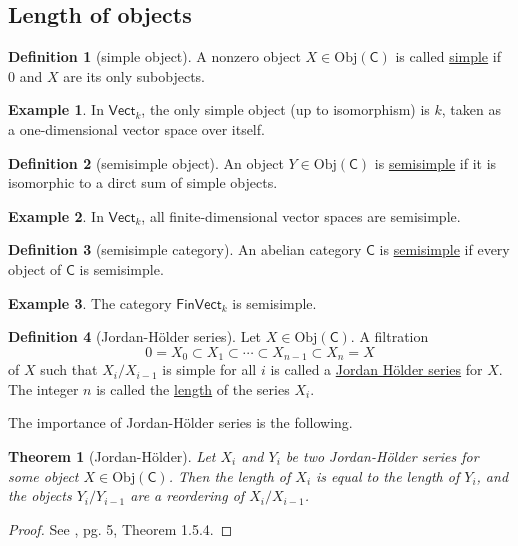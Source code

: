 \documentclass[a4paper,10pt]{scrreprt}
\newcommand{\defn}[1]{\ul{#1}}
\newcommand{\Obj}{\mathrm{Obj}}
\theoremstyle{definition}
\newtheorem{definition}{Definition}[section]
\newtheorem{example}{Example}[section]
\theoremstyle{plain}
\newtheorem{theorem}{Theorem}[section]
\theoremstyle{remark}
\begin{document}
\subsection{Length of objects}
\begin{definition}[simple object]
  \label{def:simpleobject}
  A nonzero object $X \in \Obj(\mathsf{C})$ is called \defn{simple} if $0$ and $X$ are its only subobjects.
\end{definition}

\begin{example}
  In $\mathsf{Vect}_{k}$, the only simple object (up to isomorphism) is $k$, taken as a one-dimensional vector space over itself.
\end{example}

\begin{definition}[semisimple object]
  \label{def:semisimpleobject}
  An object $Y \in \Obj(\mathsf{C})$ is \defn{semisimple} if it is isomorphic to a dirct sum of simple objects.
\end{definition}

\begin{example}
  In $\mathsf{Vect}_{k}$, all finite-dimensional vector spaces are semisimple.
\end{example}

\begin{definition}[semisimple category]
  \label{def:semisimple category}
  An abelian category $\mathsf{C}$ is \defn{semisimple} if every object of $\mathsf{C}$ is semisimple.
\end{definition}

\begin{example}
  The category $\mathsf{FinVect}_{k}$ is semisimple.
\end{example}

\begin{definition}[Jordan-H{\"o}lder series]
  \label{def:jordanholderseries}
  Let $X \in \Obj(\mathsf{C})$. A filtration 
  \begin{equation*}
    0 = X_{0} \subset X_{1} \subset \cdots \subset X_{n-1} \subset X_{n} = X
  \end{equation*}
  of $X$ such that $X_{i} / X_{i-1}$ is simple for all $i$ is called a \defn{Jordan H{\"o}lder series} for $X$. The integer $n$ is called the \defn{length} of the series $X_{i}$.
\end{definition}

The importance of Jordan-H{\"o}lder series is the following.

\begin{theorem}[Jordan-H{\"o}lder]
  \label{thm:jordanholdertheorem}
  Let $X_{i}$ and $Y_{i}$ be two Jordan-H{\"o}lder series for some object $X \in \Obj(\mathsf{C})$. Then the length of $X_{i}$ is equal to the length of $Y_{i}$, and the objects $Y_{i}/Y_{i-1}$ are a reordering of $X_{i}/X_{i-1}$.
\end{theorem}
\begin{proof}
  See \cite{EGNO-tensor-categories}, pg. 5, Theorem 1.5.4.
\end{proof}
\end{document}
